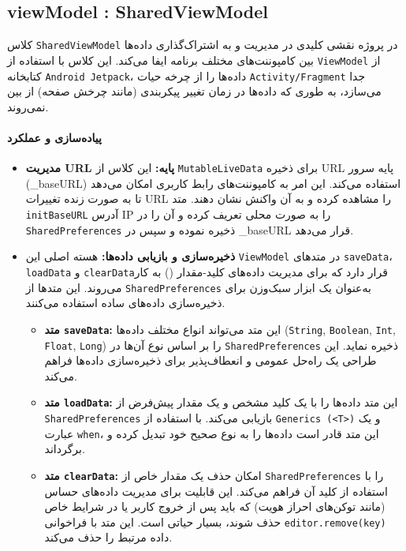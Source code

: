 \documentclass{report}
\begin{document}
\subsection{ viewModel :  SharedViewModel}
کلاس \texttt{SharedViewModel} در پروژه نقشی کلیدی در مدیریت و به اشتراک‌گذاری داده‌ها بین کامپوننت‌های مختلف برنامه ایفا می‌کند. این کلاس با استفاده از \texttt{ViewModel} از کتابخانه \texttt{Android Jetpack}، داده‌ها را از چرخه حیات \texttt{Activity/Fragment} جدا می‌سازد، به طوری که داده‌ها در زمان تغییر پیکربندی (مانند چرخش صفحه) از بین نمی‌روند.

\paragraph{پیاده‌سازی و عملکرد}

\begin{itemize}
	\item \textbf{مدیریت URL پایه:} این کلاس از \texttt{MutableLiveData} برای ذخیره URL پایه سرور (\_baseURL) استفاده می‌کند. این امر به کامپوننت‌های رابط کاربری امکان می‌دهد تا به صورت زنده تغییرات URL را مشاهده کرده و به آن واکنش نشان دهند. متد \texttt{initBaseURL} آدرس IP را به صورت محلی تعریف کرده و آن را در \texttt{SharedPreferences} ذخیره نموده و سپس در \_baseURL قرار می‌دهد.
	
	\item \textbf{ذخیره‌سازی و بازیابی داده‌ها:} هسته اصلی این \texttt{ViewModel} در متدهای \texttt{saveData}، \texttt{loadData} و \texttt{clearData}قرار دارد که برای مدیریت داده‌های کلید-مقدار  () به کار می‌روند. این متدها از \texttt{SharedPreferences} به‌عنوان یک ابزار سبک‌وزن برای ذخیره‌سازی داده‌های ساده استفاده می‌کنند.
	\begin{itemize}
		\item \textbf{متد \texttt{saveData}:} این متد می‌تواند انواع مختلف داده‌ها (\texttt{String}, \texttt{Boolean}, \texttt{Int}, \texttt{Float}, \texttt{Long}) را بر اساس نوع آن‌ها در \texttt{SharedPreferences} ذخیره نماید. این طراحی یک راه‌حل عمومی و انعطاف‌پذیر برای ذخیره‌سازی داده‌ها فراهم می‌کند.
		
		\item \textbf{متد \texttt{loadData}:} این متد داده‌ها را با یک کلید مشخص و یک مقدار پیش‌فرض از \texttt{SharedPreferences} بازیابی می‌کند. با استفاده از \texttt{Generics (<T>)} و یک عبارت \texttt{when}، این متد قادر است داده‌ها را به نوع صحیح خود تبدیل کرده و برگرداند.
		
		
		\item \textbf{متد \texttt{clearData}:} امکان حذف یک مقدار خاص از \texttt{SharedPreferences} را با استفاده از کلید آن فراهم می‌کند. 
		این قابلیت برای مدیریت داده‌های حساس (مانند توکن‌های احراز هویت) که باید پس از خروج کاربر یا در شرایط خاص حذف شوند، بسیار حیاتی است. 
		این متد با فراخوانی \texttt{editor.remove(key)} داده مرتبط را حذف می‌کند.
		

\end{itemize}
\end{itemize}
\end{document}
